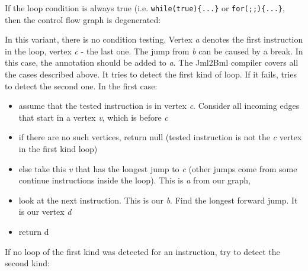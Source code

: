 \documentclass{article}
\begin{document}
If the loop condition is always true (i.e. \texttt{while(true)\{...\}} or \texttt{for(;;)\{...\}}, then the control flow graph is degenerated:
\begin{center}
\end{center}
In this variant, there is no condition testing. Vertex \textit{a} denotes the first instruction in the loop, vertex \textit{c} - the last one. The jump from \textit{b} can be caused by a break. In this case, the annotation should be added to \textit{a}. The Jml2Bml compiler covers all the cases described above. It tries to detect the first kind of loop. If it fails, tries to detect the second one. In the first case:
\begin{itemize}
\item{assume that the tested instruction is in vertex \textit{c}. Consider all incoming edges that start in a vertex \textit{v}, which is before \textit{c}}
\item{if there are no such vertices, return null (tested instruction is not the \textit{c} vertex in the first kind loop)}
\item{else take this \textit{v} that has the longest jump to \textit{c} (other jumps come from some continue instructions inside the loop). This is \textit{a} from our graph,}
\item{look at the next instruction. This is our \textit{b}. Find the longest forward jump. It is our vertex \textit{d}}
\item{return d}
\end{itemize}
If no loop of the first kind was detected for an instruction, try to detect the second kind:
\end{document}
